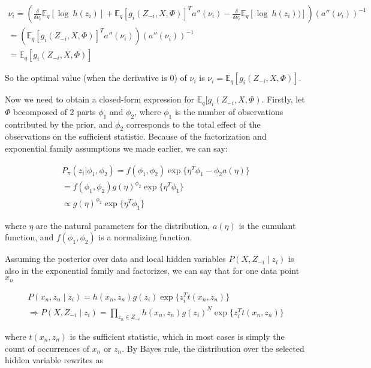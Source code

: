 \begin{align}
\nonumber \nu_i = \left( \frac{\delta}{\delta \nu_i} \mathbb{E}_q [\log\ h(z_i)] + \mathbb{E}_q[g_i(Z_{-i}, X, \Phi)]^Ta''(\nu_i) -  \frac{\delta}{\delta \nu_i} \mathbb{E}_q[\log\ h(z_i))] \right) \left(a''(\nu_i)\right)^{-1} \\
\nonumber =  \left( \mathbb{E}_q[g_i(Z_{-i}, X, \Phi)]^Ta''(\nu_i) \right) \left(a''(\nu_i)\right)^{-1} \\
= \mathbb{E}_q[g_i(Z_{-i}, X, \Phi)]
\end{align}

So the optimal value (when the derivative is $0$) of $\nu_i$ is $\nu_i = \mathbb{E}_q[g_i(Z_{-i}, X, \Phi)]$. 

Now we need to obtain a closed-form expression for $\mathbb{E}_q[g_i(Z_{-i}, X, \Phi)$. Firstly, let $\Phi$ becomposed of 2 parts $\phi_1$ and $\phi_2$, where $\phi_1$ is the number of observations contributed by the prior, and $\phi_2$ corresponds to the total effect of the observations on the sufficient statistic. Because of the factorization and exponential family assumptions we made earlier, we can say:

\begin{align}
\nonumber P_{\pi}(z_i | \phi_1, \phi_2) = f(\phi_1, \phi_2) \exp\big\{\eta^T\phi_1 - \phi_2 a(\eta)\big\} \\
\nonumber = f(\phi_1, \phi_2) g(\eta)^{\phi_2}\exp\big\{\eta^T\phi_1 \big\}\\
\propto g(\eta)^{\phi_2}\exp\big\{\eta^T\phi_1 \big\}
\end{align}

where $\eta$ are the natural parameters for the distribution, $a(\eta)$ is the cumulant function, and $f(\phi_1, \phi_2)$ is a normalizing function. 

Assuming the posterior over data and local hidden variables $P(X, Z_{-i} \mid z_i)$ is also in the exponential family and factorizes, we can say that for one data point $x_n$ 

\begin{align}
\nonumber P(x_n, z_n \mid z_i) = h(x_n, z_n) g(z_i)\exp\big\{z_i^T t(x_n, z_n)\big\} \\
\Rightarrow P(X,Z_{-i} \mid z_i) = \prod\limits_{z_n \in Z_{-i}}  h(x_n, z_n) g(z_i)^N \exp\big\{z_i^T t(x_n, z_n)\big\} 
\end{align}

where $t(x_n, z_n)$ is the sufficient statistic, which in most cases is simply the count of occurrences of $x_n$ or $z_n$. By Bayes rule, the distribution over the selected hidden variable rewrites as  

